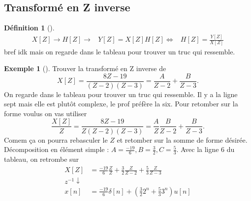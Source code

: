\documentclass{article}
\theoremstyle{plain}%
\theoremstyle{definition}
\newtheorem{defn}{Définition}[section]
\newtheorem{exmp}{Exemple}[section]
\theoremstyle{remark}
\begin{document}
\subsection{Transformé en Z inverse}
\begin{defn}[]
    \begin{align*}
        X[Z] \to H[Z] \to &Y[Z] = X[Z]H[Z]
       \Leftrightarrow & H[Z] = \frac{Y[Z]}{X[Z]}
    \end{align*}
    bref idk mais on regarde dans le tableau pour trouver un truc qui ressemble.
\end{defn}
\begin{exmp}[]
    Trouver la transformé en Z inverse de 
    \[
        X[Z] = \frac{8Z - 19}{(Z-2)(Z-3)} = \frac{A}{Z-2} + \frac{B}{Z-3}
    .\]
    On regarde dans le tableau pour trouver un truc qui ressemble. Il y a la ligne sept mais elle est plutôt complexe, le prof préfère la six. Pour retomber sur la forme voulus on vas utiliser 
    \[
        \frac{X[Z]}{Z} = \frac{8Z - 19}{Z(Z-2)(Z-3)} = \frac{A}{Z} \frac{B}{Z-2} + \frac{B}{Z-3}
    .\]
    Comem ça on pourra rebasculer le $ Z $ et retomber sur la somme de forme désirée. \\
    Décomposition en élément simple : $ A = \frac{-19}{6}, B = \frac{3}{2}, C = \frac{5}{3} $. Avec la ligne 6 du tableau, on retrombe sur
    \begin{align*}
        X[Z] &= \frac{-19}{6} \frac{Z}{Z} + \frac{3}{2} \frac{Z}{Z-2} + \frac{5}{3} \frac{Z}{Z-3} \\
        z^{-1}\downarrow & \\
        x[n] &= \frac{-19}{6} \delta [n] + (\frac{3}{2}2^n + \frac{5}{3}3^n)u[n]
    \end{align*}
\end{exmp}
\end{document}
